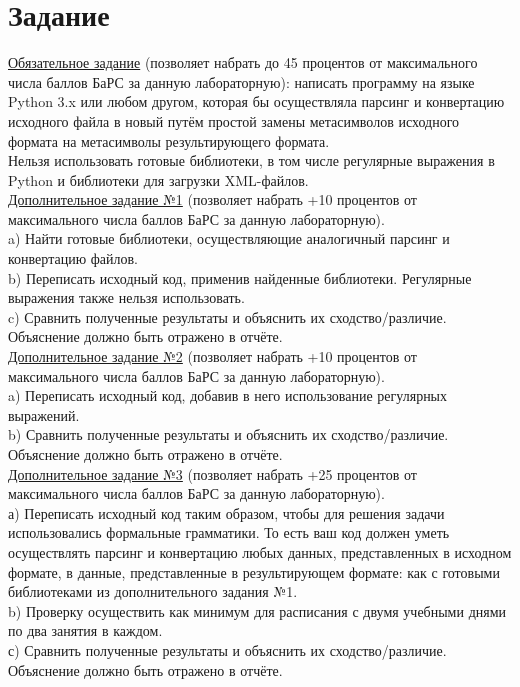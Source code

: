 \section{Задание}
\underline{Обязательное задание} (позволяет набрать до 45 процентов от максимального числа баллов БаРС за данную лабораторную): написать программу на языке Python 3.x или любом другом, которая бы осуществляла парсинг и конвертацию исходного файла в новый путём простой замены метасимволов исходного формата на метасимволы результирующего формата. \\
Нельзя использовать готовые библиотеки, в том числе регулярные выражения в Python и библиотеки для загрузки XML-файлов. \\
\underline{Дополнительное задание №1} (позволяет набрать +10 процентов от максимального числа баллов БаРС за данную лабораторную). \\
a) Найти готовые библиотеки, осуществляющие аналогичный парсинг и конвертацию файлов. \\
b) Переписать исходный код, применив найденные
библиотеки. Регулярные выражения также нельзя
использовать. \\
c) Сравнить полученные результаты и объяснить их
сходство/различие. Объяснение должно быть отражено в
отчёте. \\
\underline{Дополнительное задание №2} (позволяет набрать +10 процентов от максимального числа баллов БаРС за данную лабораторную). \\
a) Переписать исходный код, добавив в него использование регулярных выражений. \\
b) Сравнить полученные результаты и объяснить их сходство/различие. Объяснение должно быть отражено в отчёте. \\
\underline{Дополнительное задание №3} (позволяет набрать +25 процентов от максимального числа баллов БаРС за данную лабораторную). \\
а) Переписать исходный код таким образом, чтобы для решения задачи использовались формальные грамматики. То есть ваш код должен уметь осуществлять парсинг и конвертацию любых данных, представленных в исходном формате, в данные, представленные в результирующем формате: как с готовыми библиотеками из дополнительного задания №1. \\
b) Проверку осуществить как минимум для расписания с двумя учебными днями по два занятия в каждом. \\
с) Сравнить полученные результаты и объяснить их сходство/различие. Объяснение должно быть отражено в отчёте. \\
